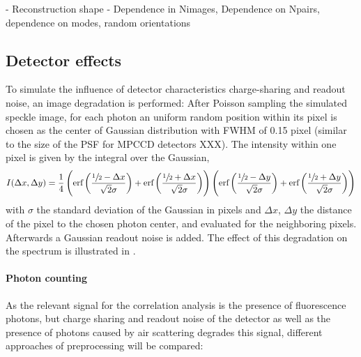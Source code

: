 - Reconstruction shape
- Dependence in Nimages, Dependence on Npairs, dependence on modes, random orientations





\subsection{Detector effects}
To simulate the influence of detector characteristics charge-sharing and readout noise, an image degradation is performed: After Poisson sampling the simulated speckle image, for each photon an uniform random position within its pixel is chosen as the center of Gaussian distribution with FWHM of 0.15 pixel  (similar to the size of the PSF for MPCCD detectors XXX).
The intensity within one pixel is given by the integral over the Gaussian,
\begin{equation}
	I(\Delta x,\Delta y)=\frac{1}{4} \left(\text{erf}\left(\frac{\sfrac{1}{2}-\Delta x}{\sqrt{2}
		\sigma}\right)+\text{erf}\left(\frac{\sfrac{1}{2}+\Delta x}{\sqrt{2} \sigma}\right)\right) \left(\text{erf}\left(\frac{\sfrac{1}{2}-\Delta y}{\sqrt{2}
		\sigma}\right)+\text{erf}\left(\frac{\sfrac{1}{2}+\Delta y}{\sqrt{2} \sigma}\right)\right)
\end{equation}
with $\sigma$ the standard deviation of the Gaussian in pixels and $\Delta x$, $\Delta y$ the distance of the pixel to the chosen photon center, and evaluated for the neighboring pixels. Afterwards a Gaussian readout noise is added. The effect of this degradation on the spectrum is illustrated in .



\paragraph{Photon counting}
As the relevant signal for the correlation analysis is the presence of fluorescence photons, but charge sharing and readout noise of the detector as well as the presence of photons caused by air scattering degrades this signal, different approaches  of preprocessing will be compared:

